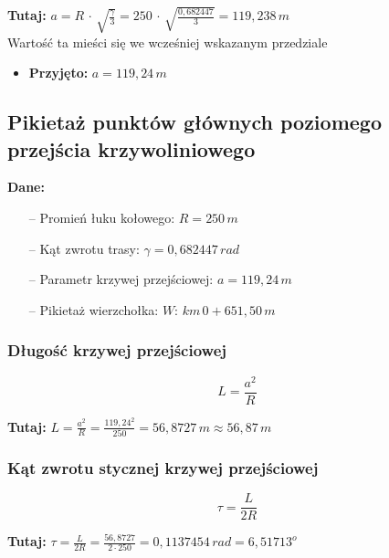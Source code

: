 \documentclass[12pt]{article}
\begin{document}
                \textbf{Tutaj:} \( a = R \,\cdot\, \sqrt{\frac{\gamma}{3}} = 250 \,\cdot\, \sqrt{\frac{0,682447}{3}} = 119,238\,m \)\\

                Wartość ta mieści się we wcześniej wskazanym przedziale
                \begin{itemize}[nolistsep]
                    \item \textbf{Przyjęto:} \( a = 119,24\,m \)
                \end{itemize}
    \subsection{Pikietaż punktów głównych poziomego\\ przejścia krzywoliniowego}
                \textbf{Dane:}
                \begin{itemize}
                    \item[--] Promień łuku kołowego: \( R=250\,m \)
                    \item[--] Kąt zwrotu trasy: \( \gamma = 0,682447\,rad \)
                    \item[--] Parametr krzywej przejściowej: \( a= 119,24\,m\)
                    \item[--] Pikietaż wierzchołka:  \( W:\,km\,0 + 651,50\,m \)
                \end{itemize}
        
        \subsubsection{Długość krzywej przejściowej}
                \begin{equation}
                    L = \frac{a^{2}}{R}
                \end{equation}

                \textbf{Tutaj:} \( L = \frac{a^2}{R} = \frac{119,24^{2}}{250} = 56,8727\,m \approx 56,87\,m  \)
        
        \subsubsection{Kąt zwrotu stycznej krzywej przejściowej}
                \begin{equation}
                    \tau = \frac{L}{2R}
                \end{equation}

                \textbf{Tutaj:} \( \tau = \frac{L}{2R} = \frac{56,8727}{2\cdot250} = 0,1137454\,rad = 6,51713^{o} \)
        
\end{document}
